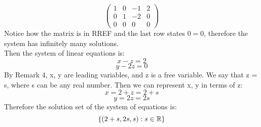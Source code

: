 \documentclass{article}
\begin{document}
\begin{homeworkProblem}
    $$\begin{pmatrix}
            1 & 0 & -1 & 2 \\
            0 & 1 & -2 & 0 \\
            0 & 0 & 0  & 0
        \end{pmatrix}$$
    Notice how the matrix is in RREF and the last row states $0 = 0$, therefore the system has infinitely many solutions.\\
    Then the system of linear equations is: $$x - z = 2$$ $$y - 2z = 0$$
    By Remark 4, x, y are leading variables, and z is a free variable. We say that z = s, where s can be any real number.
    Then we can represent x, y in terms of z: $$ x = 2 + z = 2 + s $$ $$y = 2z = 2s$$
    Therefore the solution set of the system of equations is:$$\left\{(2 + s, 2s, s):s \in \mathbb{R}\right\}$$
\end{homeworkProblem}
\end{document}
